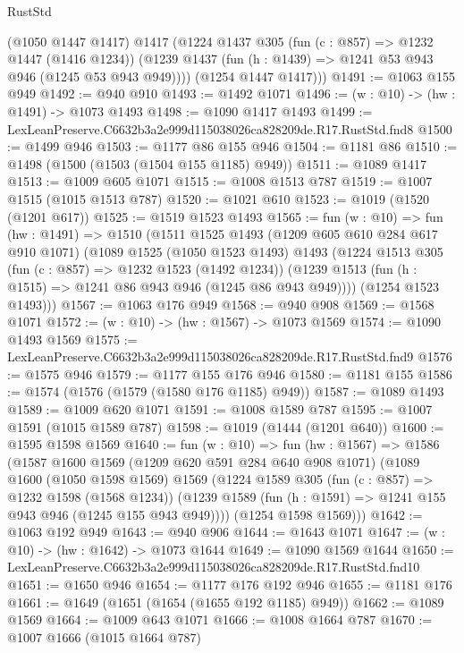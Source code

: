 \begin{lexlean}{RustStd}
\begin{coremodule}
        (@1050 @1447 @1417)
        @1417
        (@1224
          @1437
          @305
          (fun (c : @857) => @1232 @1447 (@1416 @1234))
          (@1239 @1437 (fun (h : @1439) => @1241 @53 @943 @946 (@1245 @53 @943 @949))))
        (@1254 @1447 @1417)))
@1491 := @1063 @155 @949
@1492 := @940 @910
@1493 := @1492 @1071
@1496 := (w : @10) -> (hw : @1491) -> @1073 @1493
@1498 := @1090 @1417 @1493
@1499 := LexLeanPreserve.C6632b3a2e999d115038026ca828209de.R17.RustStd.fnd8
@1500 := @1499 @946
@1503 := @1177 @86 @155 @946
@1504 := @1181 @86
@1510 := @1498 (@1500 (@1503 (@1504 @155 @1185) @949))
@1511 := @1089 @1417
@1513 := @1009 @605 @1071
@1515 := @1008 @1513 @787
@1519 := @1007 @1515 (@1015 @1513 @787)
@1520 := @1021 @610
@1523 := @1019 (@1520 (@1201 @617))
@1525 := @1519 @1523 @1493
@1565 := fun (w : @10) =>
  fun (hw : @1491) =>
  @1510
    (@1511
      @1525
      @1493
      (@1209 @605 @610 @284 @617 @910 @1071)
      (@1089
        @1525
        (@1050 @1523 @1493)
        @1493
        (@1224
          @1513
          @305
          (fun (c : @857) => @1232 @1523 (@1492 @1234))
          (@1239 @1513 (fun (h : @1515) => @1241 @86 @943 @946 (@1245 @86 @943 @949))))
        (@1254 @1523 @1493)))
@1567 := @1063 @176 @949
@1568 := @940 @908
@1569 := @1568 @1071
@1572 := (w : @10) -> (hw : @1567) -> @1073 @1569
@1574 := @1090 @1493 @1569
@1575 := LexLeanPreserve.C6632b3a2e999d115038026ca828209de.R17.RustStd.fnd9
@1576 := @1575 @946
@1579 := @1177 @155 @176 @946
@1580 := @1181 @155
@1586 := @1574 (@1576 (@1579 (@1580 @176 @1185) @949))
@1587 := @1089 @1493
@1589 := @1009 @620 @1071
@1591 := @1008 @1589 @787
@1595 := @1007 @1591 (@1015 @1589 @787)
@1598 := @1019 (@1444 (@1201 @640))
@1600 := @1595 @1598 @1569
@1640 := fun (w : @10) =>
  fun (hw : @1567) =>
  @1586
    (@1587
      @1600
      @1569
      (@1209 @620 @591 @284 @640 @908 @1071)
      (@1089
        @1600
        (@1050 @1598 @1569)
        @1569
        (@1224
          @1589
          @305
          (fun (c : @857) => @1232 @1598 (@1568 @1234))
          (@1239 @1589 (fun (h : @1591) => @1241 @155 @943 @946 (@1245 @155 @943 @949))))
        (@1254 @1598 @1569)))
@1642 := @1063 @192 @949
@1643 := @940 @906
@1644 := @1643 @1071
@1647 := (w : @10) -> (hw : @1642) -> @1073 @1644
@1649 := @1090 @1569 @1644
@1650 := LexLeanPreserve.C6632b3a2e999d115038026ca828209de.R17.RustStd.fnd10
@1651 := @1650 @946
@1654 := @1177 @176 @192 @946
@1655 := @1181 @176
@1661 := @1649 (@1651 (@1654 (@1655 @192 @1185) @949))
@1662 := @1089 @1569
@1664 := @1009 @643 @1071
@1666 := @1008 @1664 @787
@1670 := @1007 @1666 (@1015 @1664 @787)

\end{coremodule}
\end{lexlean}
